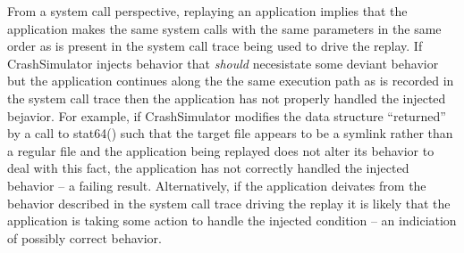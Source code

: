     From a system call perspective, replaying an application implies that the application makes the same system calls
    with the same parameters in the same order as is present in the system call trace being used to drive the replay.
    If CrashSimulator injects behavior that \emph{should} necesistate some deviant behavior but the application
    continues along the the same execution path as is recorded in the system call trace then the application has not
    properly handled the injected bejavior.  For example, if CrashSimulator modifies the data structure ``returned'' by
    a call to stat64() such that the target file appears to be a symlink rather than a regular file and the application
    being replayed does not alter its behavior to deal with this fact, the application has not correctly handled the
    injected behavior -- a failing result.  Alternatively, if the application deivates from the behavior described in
    the system call trace driving the replay it is likely that the application is taking some action to handle the
    injected condition -- an indiciation of possibly correct behavior.